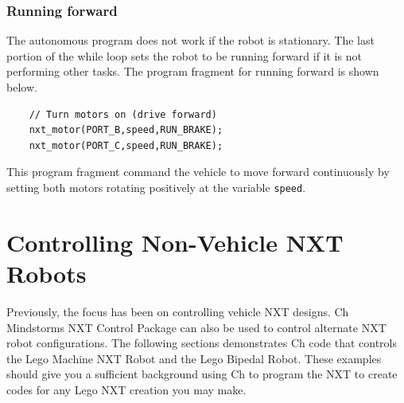 \documentclass[12pt]{article}
\begin{document}
\subsubsection*{Running forward}
The autonomous program does not work if the robot is stationary.
The last portion of the while loop sets the robot to be running forward if it is not performing other tasks.
The program fragment for running forward is shown below.
\begin{verbatim}
    // Turn motors on (drive forward)
    nxt_motor(PORT_B,speed,RUN_BRAKE);
    nxt_motor(PORT_C,speed,RUN_BRAKE);
\end{verbatim}
This program fragment command the vehicle to move forward continuously by setting both motors rotating positively at
    the variable \verb+speed+.

\section{Controlling Non-Vehicle NXT Robots}
Previously, the focus has been on controlling vehicle NXT designs. Ch Mindstorms NXT Control Package can 
also be used to control alternate NXT robot configurations. The following sections demonstrates Ch code 
that controls the Lego Machine NXT Robot and the Lego Bipedal Robot. These examples should give you a 
sufficient background using Ch to program the NXT to create codes for any Lego NXT creation you may make.

\end{document}
